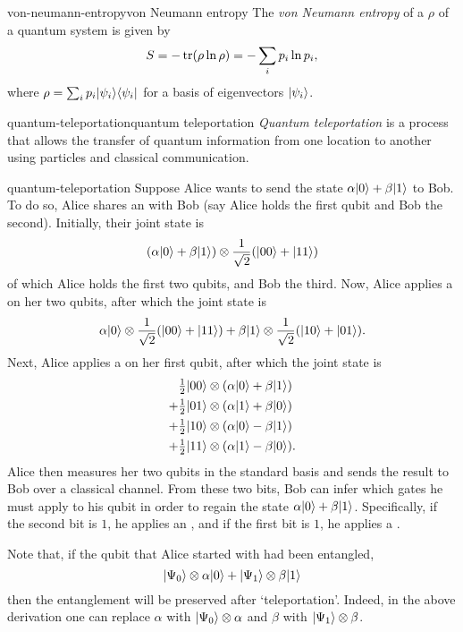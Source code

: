 \begin{topic}{von-neumann-entropy}{von Neumann entropy}
    The \emph{von Neumann entropy} of a  $\rho$ of a quantum system is given by
    \[ S = - \operatorname{tr} ( \rho \ln \rho ) = - \sum_i p_i \ln p_i , \]
    where $\rho = \sum_i p_i |\psi_i\rangle \langle\psi_i|$ for a basis of eigenvectors $|\psi_i\rangle$.
\end{topic}

\begin{topic}{quantum-teleportation}{quantum teleportation}
    \emph{Quantum teleportation} is a process that allows the transfer of quantum information from one location to another using  particles and classical communication.
\end{topic}

\begin{example}{quantum-teleportation}
    Suppose Alice wants to send the  state $\alpha |0\rangle + \beta |1\rangle$ to Bob. To do so, Alice shares an  with Bob (say Alice holds the first qubit and Bob the second). Initially, their joint state is
    \[ (\alpha |0\rangle + \beta |1\rangle) \otimes \frac{1}{\sqrt{2}} (|00\rangle + |11\rangle) \]
    of which Alice holds the first two qubits, and Bob the third. Now, Alice applies a  on her two qubits, after which the joint state is
    \[ \alpha |0\rangle \otimes \frac{1}{\sqrt{2}} (|00\rangle + |11\rangle) + \beta |1\rangle \otimes \frac{1}{\sqrt{2}} (|10\rangle + |01\rangle) . \]
    Next, Alice applies a  on her first qubit, after which the joint state is
    \[ \begin{aligned}
        & \tfrac{1}{2} |00\rangle \otimes (\alpha |0\rangle + \beta |1\rangle) \\
        + & \tfrac{1}{2} |01\rangle \otimes (\alpha |1\rangle + \beta |0\rangle) \\
        + & \tfrac{1}{2} |10\rangle \otimes (\alpha |0\rangle - \beta |1\rangle) \\
        + & \tfrac{1}{2} |11\rangle \otimes (\alpha |1\rangle - \beta |0\rangle) .
    \end{aligned} \]
    Alice then measures her two qubits in the standard basis and sends the result to Bob over a classical channel. From these two bits, Bob can infer which gates he must apply to his qubit in order to regain the state $\alpha |0\rangle + \beta |1\rangle$. Specifically, if the second bit is $1$, he applies an , and if the first bit is $1$, he applies a .

    Note that, if the qubit that Alice started with had been entangled,
    \[ |\Psi_0\rangle \otimes \alpha |0\rangle + |\Psi_1\rangle \otimes \beta |1\rangle \]
    then the entanglement will be preserved after `teleportation'. Indeed, in the above derivation one can replace $\alpha$ with $|\Psi_0\rangle \otimes \alpha$ and $\beta$ with $|\Psi_1\rangle \otimes \beta$.
\end{example}

